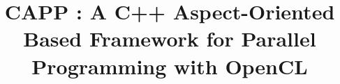 \documentclass{sig-alternate-05-2015}
\begin{document}






%

\title{CAPP : A C++ Aspect-Oriented Based Framework for Parallel Programming with OpenCL}
%
%
%
%
%
\end{document}

